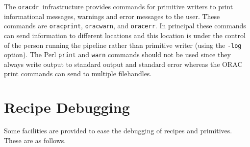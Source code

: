 \documentclass[twoside,11pt]{article}
\renewcommand{\_}{\texttt{\symbol{95}}}
\newcommand{\oracdr}{\texttt{oracdr}}
\begin{document}
The \oracdr\ infrastructure provides commands for primitive writers
to print informational messages, warnings and error messages to the
user. These commands are \texttt{orac\_print}, \texttt{orac\_warn},
and \texttt{orac\_err}. In principal these commands can send
information to different locations and this location is under the control of
the person running the pipeline rather than primitive writer (using
the \texttt{-log} option). The Perl \texttt{print} and \texttt{warn}
commands should not be used since they always write output to standard 
output and standard error whereas the ORAC print commands can send to
multiple filehandles.

\section{Recipe Debugging}

Some facilities are provided to ease the debugging of recipes and
primitives. These are as follows.
\end{document}
